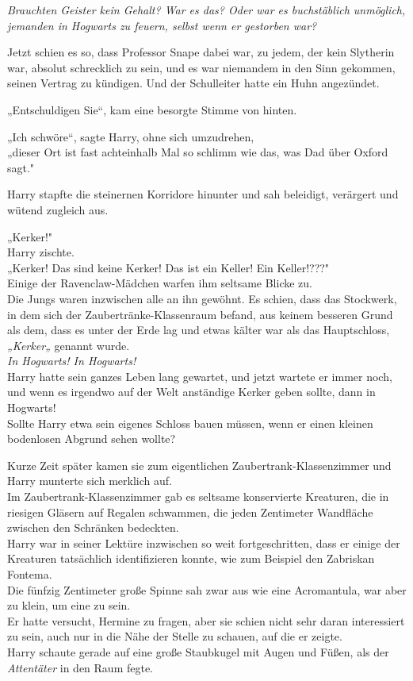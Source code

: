 {\emph{Brauchten Geister kein Gehalt? War es das? Oder war es buchstäblich unmöglich, jemanden in Hogwarts zu feuern, selbst wenn er gestorben war?}

Jetzt schien es so, dass Professor Snape dabei war, zu jedem, der kein Slytherin war, absolut schrecklich zu sein, und es war niemandem in den Sinn gekommen, seinen Vertrag zu kündigen. Und der Schulleiter hatte ein Huhn angezündet.

„Entschuldigen Sie“, kam eine besorgte Stimme von hinten.

„Ich schwöre“, sagte Harry, ohne sich umzudrehen,\\ „dieser Ort ist fast achteinhalb Mal so schlimm wie das, was Dad über Oxford sagt."

Harry stapfte die steinernen Korridore hinunter und sah beleidigt, verärgert und wütend zugleich aus.

„Kerker!"\\ Harry zischte.\\ „Kerker! Das sind keine Kerker! Das ist ein Keller! Ein Keller!???"\\ Einige der Ravenclaw-Mädchen warfen ihm seltsame Blicke zu.\\ Die Jungs waren inzwischen alle an ihn gewöhnt. Es schien, dass das Stockwerk, in dem sich der Zaubertränke-Klassenraum befand, aus keinem besseren Grund als dem, dass es unter der Erde lag und etwas kälter war als das Hauptschloss, \emph{„Kerker„} genannt wurde.\\ \emph{In Hogwarts! In Hogwarts!}\\ Harry hatte sein ganzes Leben lang gewartet, und jetzt wartete er immer noch, und wenn es irgendwo auf der Welt anständige Kerker geben sollte, dann in Hogwarts!\\ Sollte Harry etwa sein eigenes Schloss bauen müssen, wenn er einen kleinen bodenlosen Abgrund sehen wollte?

Kurze Zeit später kamen sie zum eigentlichen Zaubertrank-Klassenzimmer und Harry munterte sich merklich auf.\\ Im Zaubertrank-Klassenzimmer gab es seltsame konservierte Kreaturen, die in riesigen Gläsern auf Regalen schwammen, die jeden Zentimeter Wandfläche zwischen den Schränken bedeckten.\\ Harry war in seiner Lektüre inzwischen so weit fortgeschritten, dass er einige der Kreaturen tatsächlich identifizieren konnte, wie zum Beispiel den Zabriskan Fontema.\\ Die fünfzig Zentimeter große Spinne sah zwar aus wie eine Acromantula, war aber zu klein, um eine zu sein.\\ Er hatte versucht, Hermine zu fragen, aber sie schien nicht sehr daran interessiert zu sein, auch nur in die Nähe der Stelle zu schauen, auf die er zeigte.\\ Harry schaute gerade auf eine große Staubkugel mit Augen und Füßen, als der \emph{Attentäter} in den Raum fegte.

}
